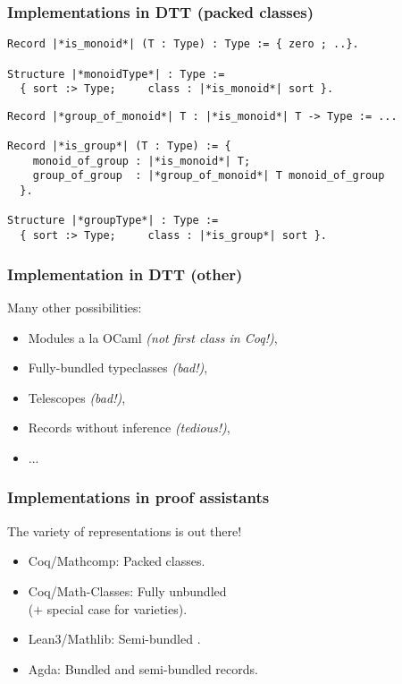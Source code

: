 \documentclass[11pt]{beamer}
\begin{document}
\begin{frame}[fragile]
  \frametitle{Implementations in DTT (packed classes)}

\begin{lstlisting}
Record |*is_monoid*| (T : Type) : Type := { zero ; ..}.

Structure |*monoidType*| : Type :=
  { sort :> Type;     class : |*is_monoid*| sort }.
\end{lstlisting}


\begin{lstlisting}
Record |*group_of_monoid*| T : |*is_monoid*| T -> Type := ...

Record |*is_group*| (T : Type) := {
    monoid_of_group : |*is_monoid*| T;
    group_of_group  : |*group_of_monoid*| T monoid_of_group
  }.

Structure |*groupType*| : Type :=
  { sort :> Type;     class : |*is_group*| sort }.
\end{lstlisting}

\end{frame}

\begin{frame}
  \frametitle{Implementation in DTT (other)}

  Many other possibilities:
  \vfill
  \begin{itemize}
  \item Modules a la {\sc OCaml} \emph{(not first class in {\sc Coq}!)},
  \vfill
  \item Fully-bundled typeclasses \emph{(bad!)},
  \vfill
  \item Telescopes \emph{(bad!)},
  \vfill
  \item Records without inference \emph{(tedious!)},
  \vfill
  \item ...
  \end{itemize}

\end{frame}

\begin{frame}
  \frametitle{Implementations in proof assistants}

  The variety of representations is out there!

  \begin{itemize}
  \item {\sc Coq/Mathcomp}:     Packed classes.
\item {\sc Coq/Math-Classes}: Fully unbundled  \\
    \hfill ($+$ special case for varieties).
  \item {\sc Lean3/Mathlib}:     Semi-bundled .
  \item {\sc Agda}:             Bundled and semi-bundled records.
  \end{itemize}
  \vfill
  \pause

  \vfill
  \pause


\end{frame}
\end{document}
